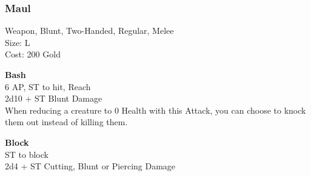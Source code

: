 \subsubsection{Maul}\label{weapon:maul}
Weapon, Blunt, Two-Handed, Regular, Melee\\
Size: L\\
Cost: 200 Gold

\textbf{Bash}\\
6 AP, ST to hit,  Reach\\
2d10 + ST Blunt Damage\\
When reducing a creature to 0 Health with this Attack, you can choose to knock them out instead of killing them.

\textbf{Block}\\
ST to block\\
2d4 + \texttimes ST Cutting, Blunt or Piercing Damage